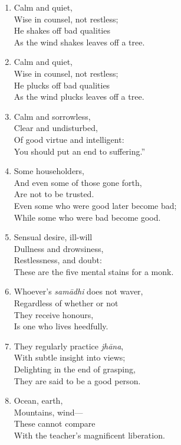 \documentclass[10pt, openany]{book}
\newcommand*{\vleftofline}[1]{\leavevmode\llap{#1}}
\begin{document}
\begin{enumerate}
\item \vleftofline{“}Calm and quiet, \\
Wise in counsel, not restless;\\
He shakes off bad qualities\\
As the wind shakes leaves off a tree.

\item Calm and quiet, \\
Wise in counsel, not restless;\\
He plucks off bad qualities\\
As the wind plucks leaves off a tree.

\item Calm and sorrowless,\\
Clear and undisturbed,\\
Of good virtue and intelligent:\\
You should put an end to suffering.”

\item \vleftofline{“}Some householders, \\
And even some of those gone forth,\\
Are not to be trusted.\\
Even some who were good later become bad;\\
While some who were bad become good.

\item Sensual desire, ill-will\\
Dullness and drowsiness,\\
Restlessness, and doubt:\\
These are the five mental stains for a monk.

\item Whoever’s \emph{samādhi} does not waver,\\
Regardless of whether or not\\
They receive honours,\\
Is one who lives heedfully.

\item They regularly practice \emph{jhāna},\\
With subtle insight into views;\\
Delighting in the end of grasping,\\
They are said to be a good person.

\item Ocean, earth,\\
Mountains, wind—\\
These cannot compare\\
With the teacher’s magnificent liberation.


\end{enumerate}
\end{document}
